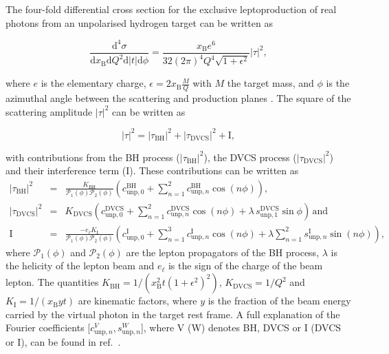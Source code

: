 \documentclass[11pt,a4paper]{article}
\begin{document}
The four-fold differential cross section for the exclusive leptoproduction of real photons
from an unpolarised hydrogen target can be written as \cite{Bel02b}
\begin{center}
\begin{equation}
\frac{\textrm{d}^4\sigma}{\textrm{d}x_{\textrm{B}}\textrm{d}Q^{2}\textrm{d}
|t|\textrm{d}\phi} =
\frac{x_{\textrm{B}}e^{6}}{32(2\pi)^{4} Q^{4}\sqrt{1+\epsilon^{2}}}
|\tau|^{2},
\end{equation}
\end{center}
where $e$ is the elementary
charge, $\epsilon=2x_\textrm{B}\frac{M}{Q}$ with $M$
the target mass, and $\phi$ is the
azimuthal angle between the scattering and production planes \cite{Tre04}.
The {square of the} scattering amplitude $|\tau|^2$ can be written as
\begin{center}
\begin{equation}
|\tau|^{2} = |\tau_{\textrm{BH}}|^{2} +
|\tau_{\textrm{DVCS}}|^{2} + \textrm{I},
\end{equation}
\end{center}
with contributions from the \textrm{BH} process ($\lvert\tau_{\textrm{BH}}\rvert^2$),
the DVCS process
($\lvert\tau_{\textrm{DVCS}}\rvert^2$) and their interference term (I). These
contributions can be written as
\begin{eqnarray}
 |\tau_{\textrm{BH}}|^{2} &=&
 \frac{K_{\textrm{BH}}}{\mathcal{P}_{1}(\phi)\mathcal{P}_{2}(\phi)} \left(c_{\textrm{unp},0}^{\textrm{BH}} + \sum_{n=1}^2
  c_{\textrm{unp},n}^{\textrm{BH}}\cos(n\phi)\right), \label{e:tbh}\\
|\tau_{\textrm{DVCS}}|^{2} &=&
K_{\textrm{DVCS}}\left(c_{\textrm{unp},0}^{\textrm{DVCS}} +
\sum_{n=1}^2
c_{\textrm{unp},n}^{\textrm{DVCS}}\cos(n\phi) + \lambda\,
s_{\textrm{unp},1}^{\textrm{DVCS}}\sin\phi\right)\,\textrm{and}
\label{e:tdvcs}\\
 \textrm{I} &=& \frac{- e_\ell
K_{\textrm{I}}}{\mathcal{P}_{1}(\phi)\mathcal{P}_{2}(\phi)}\left(c_{\textrm{unp},0}^{\textrm{
I}}+
\sum_{n=1}^3 c_{\textrm{unp},n}^{\textrm{I}}\cos(n\phi) + \lambda \sum_{n=1}^2
s_{\textrm{unp},n}^{\textrm{I}}\sin(n\phi)\right),\label{e:ti}
\end{eqnarray}
where $\mathcal{P}_1(\phi)$ and $\mathcal{P}_2(\phi)$ are the lepton propagators
of the BH process, $\lambda$ is the
helicity of the lepton beam and $e_\ell$ is the sign of the charge of
 the beam lepton.  The
quantities $K_{\textrm{BH}}=1/(x_\textrm{B}^2t(1+\epsilon^2)^2)$,
$K_{\textrm{DVCS}}=1/Q^2$
and $K_{\textrm{I}}=1/(x_{\textrm{B}}yt)$ are kinematic factors, where
$y$ is the fraction of the beam energy carried by the virtual photon in
the target rest frame. A full explanation of the Fourier coefficients [$c_{\textrm{unp},n}^V,s_{\textrm{unp},n}^W$], where V (W) denotes BH, DVCS or I (DVCS or I), can be found in ref.~\cite{Bel02b}.
 
\end{document}
